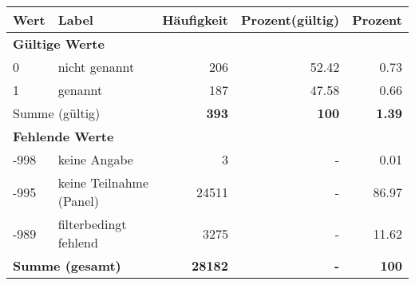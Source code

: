      \begin{longtable}{lXrrr}
     \toprule
     \textbf{Wert} & \textbf{Label} & \textbf{Häufigkeit} & \textbf{Prozent(gültig)} & \textbf{Prozent} \\
     \endhead
     \midrule
     \multicolumn{5}{l}{\textbf{Gültige Werte}}\\

     0 &
     \multicolumn{1}{X}{ nicht genannt   } &


       \num{206} &
       \num[round-mode=places,round-precision=2]{52.42} &
         \num[round-mode=places,round-precision=2]{0.73} \\

     1 &
     \multicolumn{1}{X}{ genannt   } &


       \num{187} &
       \num[round-mode=places,round-precision=2]{47.58} &
         \num[round-mode=places,round-precision=2]{0.66} \\
     \midrule
     \multicolumn{2}{l}{Summe (gültig)} &
       \textbf{\num{393}} &
     \textbf{100} &
       \textbf{\num[round-mode=places,round-precision=2]{1.39}} \\
     \multicolumn{5}{l}{\textbf{Fehlende Werte}}\\
       -998 &
       keine Angabe &
         \num{3} &
        - &
         \num[round-mode=places,round-precision=2]{0.01} \\
       -995 &
       keine Teilnahme (Panel) &
         \num{24511} &
        - &
         \num[round-mode=places,round-precision=2]{86.97} \\
       -989 &
       filterbedingt fehlend &
         \num{3275} &
        - &
         \num[round-mode=places,round-precision=2]{11.62} \\
     \midrule
     \multicolumn{2}{l}{\textbf{Summe (gesamt)}} &
          \textbf{\num{28182}} &
        \textbf{-} &
        \textbf{100} \\
     \bottomrule
     \end{longtable}
     
